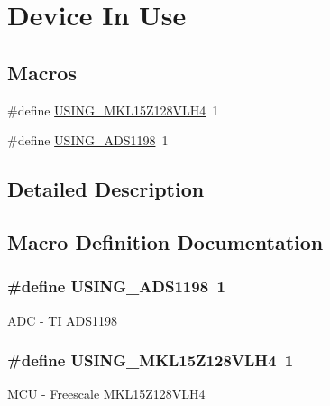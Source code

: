 \hypertarget{group___dev_use}{\section{Device In Use}
\label{group___dev_use}
}
\subsection*{Macros}
\begin{DoxyCompactItemize}
\item 
\#define \hyperlink{group___dev_use_ga4a4a3946642650d5f7094253a8b21835}{U\-S\-I\-N\-G\-\_\-\-M\-K\-L15\-Z128\-V\-L\-H4}~1
\item 
\#define \hyperlink{group___dev_use_ga4886c5486e63cda20a1bf09b1d5ed0de}{U\-S\-I\-N\-G\-\_\-\-A\-D\-S1198}~1
\end{DoxyCompactItemize}


\subsection{Detailed Description}


\subsection{Macro Definition Documentation}
\hypertarget{group___dev_use_ga4886c5486e63cda20a1bf09b1d5ed0de}{
\subsubsection[{U\-S\-I\-N\-G\-\_\-\-A\-D\-S1198}]{\setlength{\rightskip}{0pt plus 5cm}\#define U\-S\-I\-N\-G\-\_\-\-A\-D\-S1198~1}}\label{group___dev_use_ga4886c5486e63cda20a1bf09b1d5ed0de}
A\-D\-C -\/ T\-I A\-D\-S1198 \hypertarget{group___dev_use_ga4a4a3946642650d5f7094253a8b21835}{
\subsubsection[{U\-S\-I\-N\-G\-\_\-\-M\-K\-L15\-Z128\-V\-L\-H4}]{\setlength{\rightskip}{0pt plus 5cm}\#define U\-S\-I\-N\-G\-\_\-\-M\-K\-L15\-Z128\-V\-L\-H4~1}}\label{group___dev_use_ga4a4a3946642650d5f7094253a8b21835}
M\-C\-U -\/ Freescale M\-K\-L15\-Z128\-V\-L\-H4 